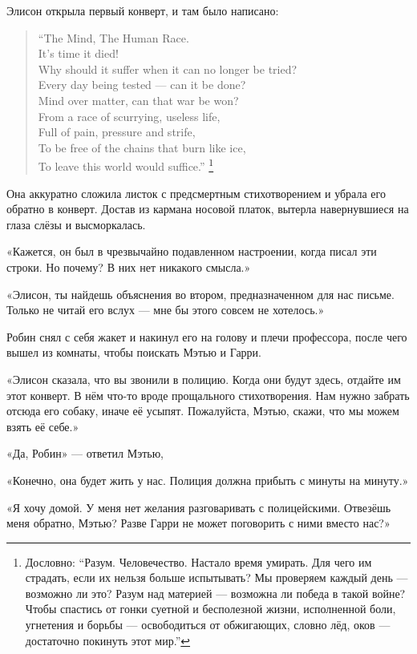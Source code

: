 \documentclass[a5paper, 9pt,
final, openany, twoside=true]{memoir}
\begin{document}
Элисон открыла первый конверт, и там было написано:
\begin{quote}
``The Mind, The Human Race.\\
It's time it died!\\
Why should it suffer when it can no longer be tried?\\
Every day being tested — can it be done?\\
Mind over matter, can that war be won?\\
From a race of scurrying, useless life,\\
Full of pain, pressure and strife,\\
To be free of the chains that burn like ice,\\
To leave this world would suffice.'' \footnote[1]{Дословно: ``Разум. Человечество. Настало время умирать. Для чего им страдать, если их нельзя больше испытывать? Мы проверяем каждый день — возможно ли это? Разум над материей — возможна ли победа в такой войне? Чтобы спастись от гонки суетной и бесполезной жизни, исполненной боли, угнетения и борьбы — освободиться от обжигающих, словно лёд, оков — достаточно покинуть этот мир.''}
\end{quote}
Она аккуратно сложила листок с предсмертным стихотворением и убрала его обратно в конверт. Достав из кармана носовой платок, вытерла навернувшиеся на глаза слёзы и высморкалась.

«Кажется, он был в чрезвычайно подавленном настроении, когда писал эти строки. Но почему? В них нет никакого смысла.»

«Элисон, ты найдешь объяснения во втором, предназначенном для нас письме. Только не читай его вслух — мне бы этого совсем не хотелось.»

Робин снял с себя жакет и накинул его на голову и плечи профессора, после чего вышел из комнаты, чтобы поискать Мэтью и Гарри.

«Элисон сказала, что вы звонили в полицию. Когда они будут здесь, отдайте им этот конверт. В нём что-то вроде прощального стихотворения. Нам нужно забрать отсюда его собаку, иначе её усыпят. Пожалуйста, Мэтью, скажи, что мы можем взять её себе.»

«Да, Робин» — ответил Мэтью,

«Конечно, она будет жить у нас. Полиция должна прибыть с минуты на минуту.»

«Я хочу домой. У меня нет желания разговаривать с полицейскими. Отвезёшь меня обратно, Мэтью? Разве Гарри не может поговорить с ними вместо нас?»
\end{document}
